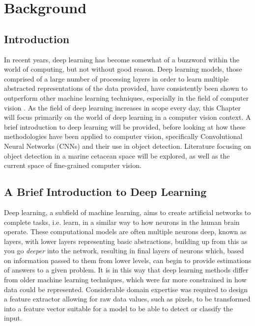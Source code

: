 \chapter{Background}\label{ch:Background}

\section{Introduction}\label{ch:Background,sec:Intro}

In recent years, deep learning has become somewhat of a buzzword within the world of computing, but not without good reason. Deep learning models, those comprised of a large number of processing layers in order to learn multiple abstracted representations of the data provided, have consistently been shown to outperform other machine learning techniques, especially in the field of computer vision \cite{lecun_deep_2015}. As the field of deep learning increases in scope every day, this Chapter will focus primarily on the world of deep learning in a computer vision context. A brief introduction to deep learning will be provided, before looking at how these methodologies have been applied to computer vision, specifically Convolutional Neural Networks (CNNs) and their use in object detection. Literature focusing on object detection in a marine cetacean space will be explored, as well as the current space of fine-grained computer vision. 

\section{A Brief Introduction to Deep Learning}\label{ch:Background,sec:DLIntro}

Deep learning, a subfield of machine learning, aims to create artificial networks to complete tasks, i.e. learn, in a similar way to how neurons in the human brain operate. These computational models are often multiple neurons deep, known as layers, with lower layers representing basic abstractions, building up from this as you go \textit{deeper} into the network, resulting in final layers of neurons which, based on information passed to them from lower levels, can begin to provide estimations of answers to a given problem. It is in this way that deep learning methods differ from older machine learning techniques, which were far more constrained in how data could be represented. Considerable domain expertise was required to design a feature extractor allowing for raw data values, such as pixels, to be transformed into a feature vector suitable for a model to be able to detect or classify the input. 

